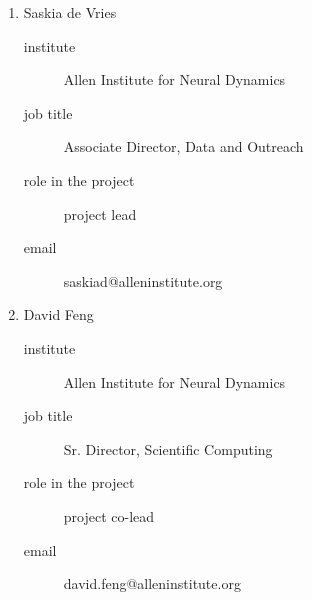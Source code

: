 
\begin{enumerate}

    \item Saskia de Vries

        \begin{description}
            \item[institute] Allen Institute for Neural Dynamics
            \item[job title] Associate Director, Data and Outreach
            \item[role in the project] project lead
            \item[email] saskiad@alleninstitute.org
        \end{description}

    \item David Feng

        \begin{description}
            \item[institute] Allen Institute for Neural Dynamics
            \item[job title] Sr. Director, Scientific Computing
            \item[role in the project] project co-lead
            \item[email] david.feng@alleninstitute.org
        \end{description}

\end{enumerate}
